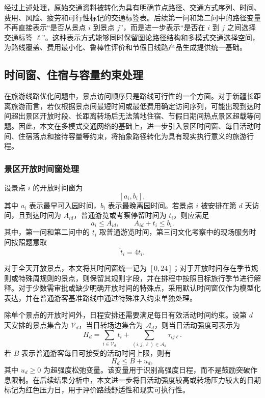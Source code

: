 \documentclass[UTF8,zihao=-4,a4paper]{ctexart}
\begin{document}
经过上述处理，原始交通资料被转化为具有明确节点路径、交通方式序列、时间、费用、风险、疲劳和可行性标记的交通标签表。后续第一问和第二问中的路径变量不再直接表示“是否从景点 $i$ 到景点 $j$”，而是进一步表示“是否在 $i$ 到 $j$ 之间选择交通标签 $\ell$”。这种表示方式能够同时保留图论路径结构和多模式交通选择空间，为路线覆盖、费用最小化、鲁棒性评价和节假日线路产品生成提供统一基础。

\subsection{时间窗、住宿与容量约束处理}
\label{subsec:time_lodging_capacity}

在旅游线路优化问题中，景点访问顺序只是路线可行性的一个方面。对于新疆长距离旅游而言，若仅根据景点间最短时间或最低费用确定访问序列，可能出现到达时间超出景区开放时段、长距离转场后无法落地住宿、节假日期间热点景区超载等问题。因此，本文在多模式交通网络的基础上，进一步引入景区时间窗、每日活动时间、住宿落点和接待容量等约束，将抽象路径转化为具有现实执行意义的旅游行程。

\subsubsection{景区开放时间窗处理}

设景点 $i$ 的开放时间窗为
\[
[a_i,b_i],
\]
其中 $a_i$ 表示最早可入园时间，$b_i$ 表示最晚离园时间。若景点 $i$ 被安排在第 $d$ 天访问，且到达时间为 $A_{id}$，普通游览或考察停留时间为 $t_i$，则应满足
\[
a_i \leq A_{id}, \qquad
A_{id}+t_i \leq b_i.
\]
其中，第一问和第二问中的 $t_i$ 取普通游览时间，第三问文化考察中的现场服务时间按照题意取
\[
\tilde{t}_i = 4t_i.
\]

对于全天开放景点，本文将其时间窗统一记为 $[0,24]$；对于开放时间存在季节规则或特殊周规则的景点，则保留其规则字段，并在排程中按照目标旅行季节进行解释。对于少数需审批或缺少明确开放时间的特殊点，采用默认时间窗仅作为模型化表达，并在普通游客基准路线中通过特殊准入约束单独处理。

除单个景点的开放时间外，日程安排还需要满足每日有效活动时间约束。设第 $d$ 天安排的景点集合为 $\mathcal{V}_d$，当日转场边集合为 $\mathcal{A}_d$，则当日活动强度可表示为
\[
H_d
=
\sum_{i\in \mathcal{V}_d} t_i
+
\sum_{(i,j,\ell)\in \mathcal{A}_d} \tau_{ij\ell}.
\]
若 $B$ 表示普通游客每日可接受的活动时间上限，则有
\[
H_d \leq B + u_d,
\]
其中 $u_d\geq 0$ 为超强度松弛变量。该变量用于识别高强度日程，而不是鼓励突破作息限制。在后续结果分析中，本文进一步将日活动强度较高或转场压力较大的日期标记为红色压力日，用于评价路线舒适性和现实可执行性。
\end{document}
